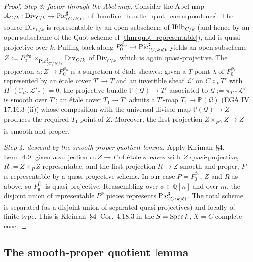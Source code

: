 \begin{proof}
  \emph{Step 3: factor through the Abel map.}
  Consider the Abel map \(A_{C/k} : \mathrm{Div}_{C/k} \to \operatorname{Pic}^\sharp_{(C/k)\mathrm{\acute{e}t}}\)
  of \cref{lem:line_bundle_quot_correspondence}. The source \(\mathrm{Div}_{C/k}\)
  is representable by an open subscheme of \(\operatorname{Hilb}_{C/k}\) (and hence by an
  open subscheme of the Quot scheme of \cref{thm:quot_representable}), and
  is quasi-projective over \(k\). Pulling back along
  \(P^{\phi_0}_0 \hookrightarrow \operatorname{Pic}^\sharp_{(C/k)\mathrm{\acute{e}t}}\) yields an open
  subscheme \(Z := P^{\phi_0}_0 \times_{\operatorname{Pic}^\sharp_{(C/k)\mathrm{\acute{e}t}}} \mathrm{Div}_{C/k}\)
  of \(\mathrm{Div}_{C/k}\), which is again quasi-projective. The projection
  \(\alpha : Z \to P^{\phi_0}_0\) is a surjection of \'etale sheaves:
  given a \(T\)-point \(\lambda\) of \(P^{\phi_0}_0\) represented by an \'etale
  cover \(T' \to T\) and an invertible sheaf \(\mathcal{L}'\) on \(C \times_k
  T'\) with \(H^1(C_{t'}, \mathcal{L}'_{t'}) = 0\), the projective bundle
  \(\mathbb{P}(\mathcal{Q}) \to T'\) associated to
  \(\mathcal{Q} := \pi_{T'*}\mathcal{L}'\) is smooth over \(T'\); an \'etale
  cover \(T_1 \to T'\) admits a \(T'\)-map \(T_1 \to \mathbb{P}(\mathcal{Q})\)
  (EGA IV 17.16.3 (ii)) whose composition with the universal divisor map
  \(\mathbb{P}(\mathcal{Q}) \to Z\) produces the required \(T_1\)-point of \(Z\).
  Moreover, the first projection \(Z \times_{P^{\phi_0}_0} Z \to Z\) is
  smooth and proper.

  \emph{Step 4: descend by the smooth-proper quotient lemma.}
  Apply Kleiman~\S 4, Lem.~4.9: given a surjection \(\alpha : Z \to P\)
  of \'etale sheaves with \(Z\) quasi-projective, \(R := Z \times_P Z\)
  representable, and the first projection \(R \to Z\) smooth and proper,
  \(P\) is representable by a quasi-projective scheme. In our case
  \(P = P^{\phi_0}_0\), \(Z\) and \(R\) as above, so \(P^{\phi_0}_0\) is
  quasi-projective. Reassembling over \(\phi \in \mathbb{Q}[n]\) and
  over \(m\), the disjoint union of representable \(P^\phi\) pieces represents
  \(\operatorname{Pic}^\sharp_{(C/k)\mathrm{\acute{e}t}}\). The total scheme is separated (as a disjoint
  union of separated quasi-projectives) and locally of finite type. This
  is Kleiman~\S 4, Cor.~4.18.3 in the \(S = \operatorname{Spec} k\),
  \(X = C\) complete case.
\end{proof}

\subsection{The smooth-proper quotient lemma}
\label{subsec:fga_pic_qt}

